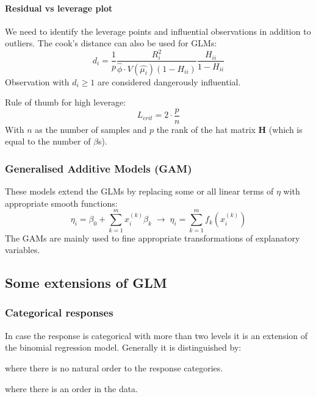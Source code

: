 \paragraph{Residual vs leverage plot}
We need to identify the leverage points and influential observations in addition to outliers. The cook's distance can also be used for GLMs:
\begin{equation*}
d_i = \frac{1}{p}\frac{R_i^2}{\hat{\phi}\cdot V(\hat{\mu_i})(1-H_{ii})}\frac{H_{ii}}{1-H_{ii}}
\end{equation*}
Observation with $d_i \geq 1$ are considered dangerously influential.

Rule of thumb for high leverage:
\begin{equation*}
	L_{crit} = 2\cdot \frac{p}{n}
\end{equation*}
With $n$ as the number of samples and $p$ the rank of the hat matrix $\bm{H}$ (which is equal to the number of $\beta$s).

\subsubsection{Generalised Additive Models (GAM)}
These models extend the GLMs by replacing some or all linear terms of $\eta$ with appropriate smooth functions:
\begin{equation*}
\eta_i = \beta_0+\sum_{k=1}^{m}x_i^{(k)}\beta_k \; \rightarrow \; \eta_i = \sum_{k=1}^{m}f_k\left(x_i^{(k)}\right)
\end{equation*}
The GAMs are mainly used to fine appropriate transformations of explanatory variables.

\subsection{Some extensions of GLM}

\subsubsection{Categorical responses}
In case the response is categorical with more than two levels it is an extension of the binomial regression model. Generally it is distinguished by:
\begin{description}
	\tightlist
	\item[Nominal data] where there is no natural order to the response	categories.
	\item[Ordinal data] where there is an order in the data.
\end{description}

